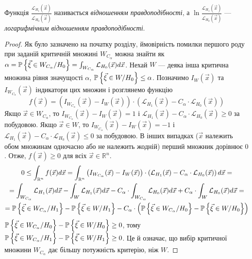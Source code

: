 \begin{remark}
    Функція $\frac{\mathcal{L}_{H_1}(\vec{x})}{\mathcal{L}_{H_0}(\vec{x})}$ називається
    \emph{відношенням правдоподібності}, а $\ln \frac{\mathcal{L}_{H_1}(\vec{x})}{\mathcal{L}_{H_0}(\vec{x})}$ ---
    \emph{логарифмічним відношенням правдоподібності}.
\end{remark}
\begin{proof}
    Як було зазначено на початку розділу, ймовірність помилки першого роду при заданій критичній множині $W_{C_\alpha}$ можна знайти як
    $\alpha = \P\left\{ \vec{\xi} \in W_{C_\alpha} / H_0\right\} = \int_{W_{C_\alpha}} \mathcal{L}_{H_0}(\vec{x}) d\vec{x}$.
    Нехай $W$ --- деяка інша критична множина рівня значущості $\alpha$, 
    $\P\left\{ \vec{\xi} \in W / H_0\right\} \leq \alpha$. Позначимо $I_W(\vec{x})$ та $I_{W_{C_\alpha}}(\vec{x})$ індикатори цих множин і
    розглянемо функцію 
    $$f(\vec{x}) = \left(I_{W_{C_\alpha}}(\vec{x}) - I_W(\vec{x})\right)\cdot \left(\mathcal{L}_{H_1}(\vec{x}) - C_{\alpha} \cdot \mathcal{L}_{H_0}(\vec{x})\right)$$
    Якщо $\vec{x} \in W_{C_\alpha}$, то $I_{W_{C_\alpha}}(\vec{x}) - I_W(\vec{x}) = 1$ і 
    $\mathcal{L}_{H_1}(\vec{x}) - C_{\alpha} \cdot \mathcal{L}_{H_0}(\vec{x}) \geq 0$ за побудовою.
    Якщо $\vec{x} \in W$, то $I_{W_{C_\alpha}}(\vec{x}) - I_W(\vec{x}) = -1$ і 
    $\mathcal{L}_{H_1}(\vec{x}) - C_{\alpha} \cdot \mathcal{L}_{H_0}(\vec{x}) \leq 0$ за побудовою.
    В інших випадках ($\vec{x}$ належить обом множинам одночасно або не належить жодній) перший множник дорівнює $0$.
    Отже, $f(\vec{x}) \geq 0$ для всіх $\vec{x} \in \mathbb{R}^n$.
    \begin{gather*}
        0 \leq \int_{\mathbb{R}^n} f(\vec{x}) d\vec{x} = 
        \int_{\mathbb{R}^n} \left(I_{W_{C_\alpha}}(\vec{x}) - I_W(\vec{x})\right)\cdot \left(\mathcal{L}_{H_1}(\vec{x}) - C_{\alpha} \cdot \mathcal{L}_{H_0}(\vec{x})\right) d\vec{x} =\\
        = \int_{W_{C_\alpha}} \mathcal{L}_{H_1}(\vec{x}) d\vec{x} - \int_{W} \mathcal{L}_{H_1}(\vec{x}) d\vec{x}
        - C_{\alpha} \cdot \int_{W_{C_\alpha}} \mathcal{L}_{H_0}(\vec{x}) d\vec{x} +
        C_{\alpha} \cdot \int_{W} \mathcal{L}_{H_0}(\vec{x}) d\vec{x} = \\
        = \P\left\{ \vec{\xi} \in W_{C_\alpha} / H_1\right\} - \P\left\{ \vec{\xi} \in W / H_1\right\} -
        C_{\alpha}\cdot\left(\P\left\{ \vec{\xi} \in W_{C_\alpha} / H_0\right\} - \P\left\{ \vec{\xi} \in W / H_0\right\}\right)
    \end{gather*}
    $\P\left\{ \vec{\xi} \in W_{C_\alpha} / H_0\right\} - \P\left\{ \vec{\xi} \in W / H_0\right\} \geq 0$, тому
    $\P\left\{ \vec{\xi} \in W_{C_\alpha} / H_1\right\} - \P\left\{ \vec{\xi} \in W / H_1\right\} \geq 0$. 
    Це й означає, що вибір критичної множини $W_{C_\alpha}$ дає більшу потужність критерію, ніж $W$.
\end{proof}
